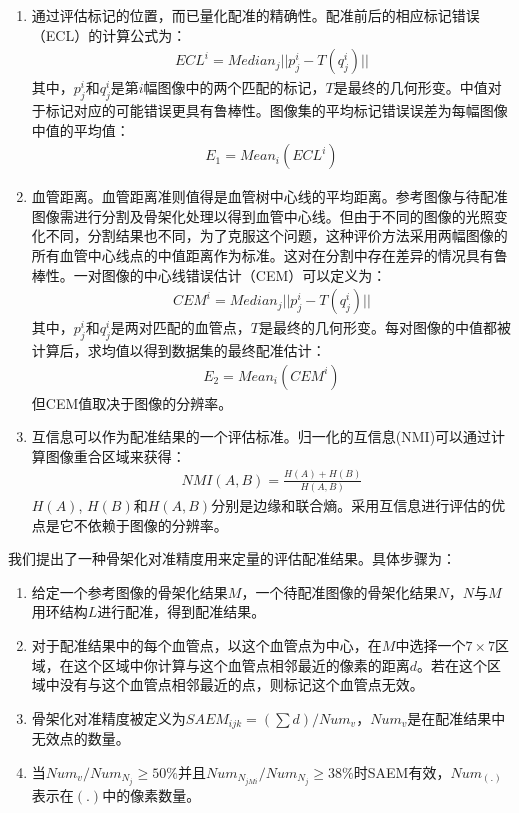 \begin{enumerate}
\item 通过评估标记的位置，而已量化配准的精确性。配准前后的相应标记错误（ECL）的计算公式为：
\begin{align}
ECL^i = Median_{j}||p_j^i - T(q_j^i)|| 
\end{align}
其中，$p_j^i$和$q_j^i$是第$i$幅图像中的两个匹配的标记，$T$是最终的几何形变。中值对于标记对应的可能错误更具有鲁棒性。图像集的平均标记错误误差为每幅图像中值的平均值：
\begin{align}
E_1 = Mean_i(ECL^i)
\end{align}
\item 血管距离。血管距离准则值得是血管树中心线的平均距离。参考图像与待配准图像需进行分割及骨架化处理以得到血管中心线。但由于不同的图像的光照变化不同，分割结果也不同，为了克服这个问题，这种评价方法采用两幅图像的所有血管中心线点的中值距离作为标准。这对在分割中存在差异的情况具有鲁棒性。一对图像的中心线错误估计（CEM）可以定义为：
\begin{align}
CEM^i  = Median_j||p_j^i - T(q_j^i)||
\end{align}
其中，$p_j^i$和$q_j^i$是两对匹配的血管点，$T$是最终的几何形变。每对图像的中值都被计算后，求均值以得到数据集的最终配准估计：
\begin{align}
E_2 = Mean_i(CEM^i)
\end{align}
但CEM值取决于图像的分辨率。
\item 互信息可以作为配准结果的一个评估标准。归一化的互信息(NMI)可以通过计算图像重合区域来获得：
\begin{align}
NMI(A, B) = \frac{H(A)+H(B)}{H(A, B)}
\end{align}
$H(A)$, $H(B)$和$H(A,B)$分别是边缘和联合熵。采用互信息进行评估的优点是它不依赖于图像的分辨率。
\end{enumerate}



我们提出了一种骨架化对准精度用来定量的评估配准结果。具体步骤为：
\begin{enumerate}
\item 给定一个参考图像的骨架化结果$M$，一个待配准图像的骨架化结果$N$，$N$与$M$用环结构$L$进行配准，得到配准结果。
\item 对于配准结果中的每个血管点，以这个血管点为中心，在$M$中选择一个$7 \times 7$区域，在这个区域中你计算与这个血管点相邻最近的像素的距离$d$。若在这个区域中没有与这个血管点相邻最近的点，则标记这个血管点无效。
\item 骨架化对准精度被定义为$SAEM_{ijk} = (\sum d) / Num_v$，$Num_v$是在配准结果中无效点的数量。
\item 当$Num_v / Num_{N_j} \geq 50 \%$并且$Num_{N_{jMi}} / Num_{N_j} \geq 38 \%$时SAEM有效，$Num_{(.)}$表示在$(.)$中的像素数量。
\end{enumerate}

